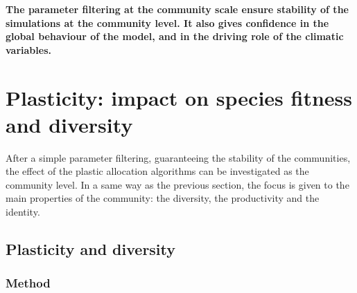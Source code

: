 \textbf{The parameter filtering at the community scale ensure stability of the simulations at the community level. It also gives confidence in the global behaviour of the model, and in the driving role of the climatic variables.}
%
%
\newpage

\chapter{Plasticity: impact on species fitness\\and diversity}

After a simple parameter filtering, guaranteeing the stability of the communities, the effect of the plastic allocation algorithms can be investigated as the community level. In a same way as the previous section, the focus is given to the main properties of the community: the diversity, the productivity and the identity. 
%
%
%

\section{Plasticity and diversity}


\subsection{Method}

